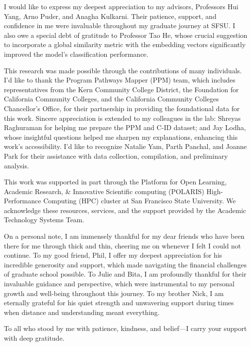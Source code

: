 \begin{acknowledgments}
I would like to express my deepest appreciation to my advisors, Professors Hui Yang, Arno Puder, and Anagha Kulkarni. Their patience, support, and confidence in me were invaluable throughout my graduate journey at SFSU. I also owe a special debt of gratitude to Professor Tao He, whose crucial suggestion to incorporate a global similarity metric with the embedding vectors significantly improved the model's classification performance.

This research was made possible through the contributions of many individuals. I'd like to thank the Program Pathways Mapper (PPM) team, which includes representatives from the Kern Community College District, the Foundation for California Community Colleges, and the California Community Colleges Chancellor's Office, for their partnership in providing the foundational data for this work.  Sincere appreciation is extended to my colleagues in the lab: Shreyas Raghuraman for helping me prepare the PPM and C-ID dataset; and Jay Lodha, whose insightful questions helped me sharpen my explanations, enhancing this work's accessibility. I'd like to recognize Natalie Yam, Parth Panchal, and Joanne Park for their assistance with data collection, compilation, and preliminary analysis.

This work was supported in part through the Platform for Open Learning, Academic Research, \& Innovative Scientific computing (POLARIS) High-Performance Computing (HPC) cluster at San Francisco State University. We acknowledge these resources, services, and the support provided by the Academic Technology Systems Team.

On a personal note, I am immensely thankful for my dear friends who have been there for me through thick and thin, cheering me on whenever I felt I could not continue. To my good friend, Phil, I offer my deepest appreciation for his incredible generosity and support, which made navigating the financial challenges of graduate school possible. To Julie and Bita, I am profoundly thankful for their invaluable guidance and perspective, which were instrumental to my personal growth and well-being throughout this journey.  To my brother Nick, I am eternally grateful for his quiet strength and unwavering support during times when distance and understanding meant everything.

To all who stood by me with patience, kindness, and belief---I carry your support with deep gratitude.
\end{acknowledgments}
